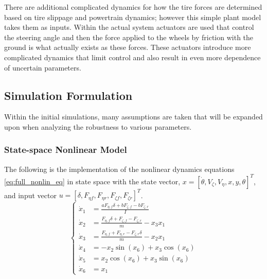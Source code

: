 \documentclass[conference, onecolumn]{IEEEtran}
\begin{document}
There are additional complicated dynamics for how the tire forces are determined based on tire slippage and powertrain dynamics; however this simple plant model takes them as inputs.
Within the actual system actuators are used that control the steering angle and then the force applied to the wheels by friction with the ground is what actually exists as these forces. 
These actuators introduce more complicated dynamics that limit control and also result in even more dependence of uncertain parameters.

\newpage
\subsection{Simulation Formulation}
Within the initial simulations, many assumptions are taken that will be expanded upon when analyzing the robustness to various parameters. 

\subsubsection{State-space Nonlinear Model}
The following is the implementation of the nonlinear dynamics equations \eqref{eq:full_nonlin_eq} in state space with the state vector, $x = [\dot{\theta}, V_\zeta, V_\eta, x, y, \theta]^T$, and input vector $u = [\delta, F_{\eta f}, F_{\eta r}, F_{\zeta f}, F_{\zeta r}]^T$. 
\begin{equation}\begin{cases}
    \dot{x}_1 &= \frac{a F_{\eta,f} \delta + b F_{\zeta,f} - b F_{\zeta,r}}{I}\\
    \dot{x}_2 &= \frac{F_{\eta,f} \delta + F_{\zeta,f} - F_{\zeta,r}}{m} - x_3 x_1\\
    \dot{x}_3 &= \frac{F_{\eta,f} + F_{\eta,r} - F_{\zeta,r}\delta}{m} - x_2 x_1\\
    \dot{x}_4 &= -x_2 \sin(x_6) + x_3 \cos(x_6)\\
    \dot{x}_5 &= x_2 \cos(x_6) + x_3 \sin(x_6)\\
    \dot{x}_6 &= x_1
\end{cases}\end{equation}
\end{document}
